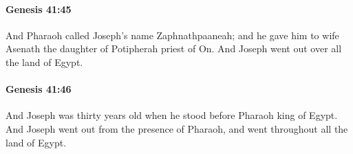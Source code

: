 		\paragraph{Genesis 41:45} %
			\label{GENESIS-41-45}

			And Pharaoh called Joseph's name Zaphnathpaaneah; and he gave him to wife Asenath the daughter of Potipherah priest of On. And Joseph went out over all the land of Egypt.


		\paragraph{Genesis 41:46} %
			\label{GENESIS-41-46}

			And Joseph was thirty years old when he stood before Pharaoh king of Egypt. And Joseph went out from the presence of Pharaoh, and went throughout all the land of Egypt.


